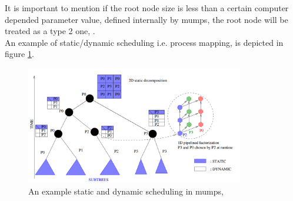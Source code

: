 It is important to mention if the root node size is less than a certain computer depended parameter value, defined internally by \acrshort{mumps}, the root node will be treated as a type 2 one, \cite{mumps-manual}.\\


An example of static/dynamic scheduling i.e. process mapping, is depicted in figure \ref{fig:mumps:mapping-and-scheduling}.\\


\figpointer{\ref{fig:mumps:mapping-and-scheduling}}
\begin{figure}[htpb]
  \centering
  \includegraphics[width=0.85\textwidth]{figures/chapter-2/mumps-task-data-parallelism-2.png}
    \caption{An example static and dynamic scheduling in \acrshort{mumps}, \cite{l2012multifrontal}}
\label{fig:mumps:mapping-and-scheduling}
\end{figure}


